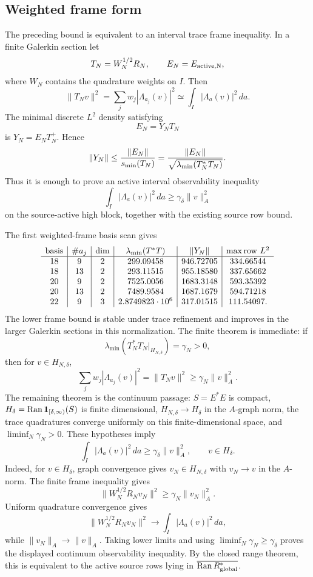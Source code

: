 \documentclass[11pt]{article}
\begin{document}
\subsection{Weighted frame form}

The preceding bound is equivalent to an interval trace frame inequality.  In a
finite Galerkin section let
\[
  T_N=W_N^{1/2}R_N,\qquad E_N=E_{\rm active,N},
\]
where \(W_N\) contains the quadrature weights on \(I\).  Then
\[
  \|T_Nv\|^2=\sum_jw_j|\Lambda_{a_j}(v)|^2
  \simeq \int_I|\Lambda_a(v)|^2\,da.
\]
The minimal discrete \(L^2\) density satisfying
\[
  E_N=Y_NT_N
\]
is \(Y_N=E_NT_N^+\).  Hence
\[
  \|Y_N\|\le {\|E_N\|\over s_{\min}(T_N)}
  ={\|E_N\|\over\sqrt{\lambda_{\min}(T_N^\ast T_N)}}.
\]
Thus it is enough to prove an active interval observability inequality
\[
  \int_I|\Lambda_a(v)|^2\,da\ge
  \gamma_\delta\|v\|_A^2
\]
on the source-active high block, together with the existing source row bound.

The first weighted-frame basis scan gives
\[
\begin{array}{c|c|c|c|c|c}
{\rm basis}&\#a_j&\dim&\lambda_{\min}(T^\ast T)&
\|Y_N\|&\max{\rm row}\ L^2\\\hline
18&9&2&299.09458& 946.72705&334.66544\\
18&13&2&293.11515& 955.18580&337.65662\\
20&9&2&7525.0056&1683.3148&593.35392\\
20&13&2&7489.9584&1687.1679&594.71218\\
22&9&3&2.8749823\cdot10^6&317.01515&111.54097.
\end{array}
\]
The lower frame bound is stable under trace refinement and improves in the
larger Galerkin sections in this normalization.  The finite theorem is
immediate: if
\[
  \lambda_{\min}(T_N^\ast T_N|_{H_{N,\delta}})=\gamma_N>0,
\]
then for \(v\in H_{N,\delta}\),
\[
  \sum_jw_j|\Lambda_{a_j}(v)|^2
  =\|T_Nv\|^2
  \ge \gamma_N\|v\|_A^2.
\]
The remaining theorem is the continuum passage: \(S=E^\ast E\) is compact,
\(H_\delta=\operatorname{Ran}{\bf 1}_{[\delta,\infty)}(S)\) is finite
dimensional, \(H_{N,\delta}\to H_\delta\) in the \(A\)-graph norm, the trace
quadratures converge uniformly on this finite-dimensional space, and
\(\liminf_N\gamma_N>0\).  These hypotheses imply
\[
  \int_I|\Lambda_a(v)|^2\,da\ge\gamma_\delta\|v\|_A^2,
  \qquad v\in H_\delta.
\]
Indeed, for \(v\in H_\delta\), graph convergence gives \(v_N\in H_{N,\delta}\)
with \(v_N\to v\) in the \(A\)-norm.  The finite frame inequality gives
\[
  \|W_N^{1/2}R_Nv_N\|^2\ge\gamma_N\|v_N\|_A^2.
\]
Uniform quadrature convergence gives
\[
  \|W_N^{1/2}R_Nv_N\|^2
  \to \int_I|\Lambda_a(v)|^2\,da,
\]
while \(\|v_N\|_A\to\|v\|_A\).  Taking lower limits and using
\(\liminf_N\gamma_N\ge\gamma_\delta\) proves the displayed continuum
observability inequality.  By the closed range theorem, this is equivalent to
the active source rows lying in
\(\overline{\operatorname{Ran}R_{\rm global}^\ast}\).
\end{document}

